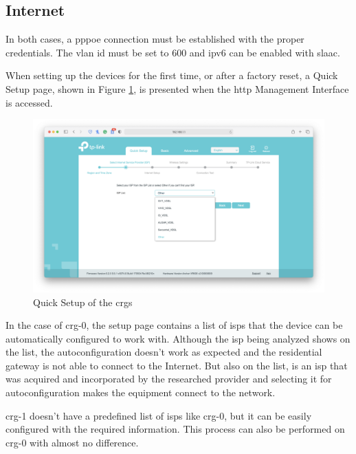 \subsection{Internet}

In both cases, a \gls{pppoe} connection must be established with the proper credentials. The \gls{vlan} \gls{id} must be set to 600 and \gls{ip}v6 can be enabled with \gls{slaac}.

When setting up the devices for the first time, or after a factory reset, a Quick Setup page, shown in Figure \ref{figure:crgs_quicksetup}, is presented when the \gls{http} Management Interface is accessed.

\begin{figure}[h]
    \centering
    \includegraphics[width=\linewidth]{contents/substituting-the-isp-cpe/internet/quick-setup.png}
    \caption{Quick Setup of the \gls{crg}s}
    \label{figure:crgs_quicksetup}
\end{figure}

In the case of \gls{crg}-0, the setup page contains a list of \glspl{isp} that the device can be automatically configured to work with. Although the \gls{isp} being analyzed shows on the list, the autoconfiguration doesn’t work as expected and the residential gateway is not able to connect to the Internet. But also on the list, is an \gls{isp} that was acquired and incorporated by the researched provider and selecting it for autoconfiguration makes the equipment connect to the network.

\gls{crg}-1 doesn’t have a predefined list of \glspl{isp} like \gls{crg}-0, but it can be easily configured with the required information. This process can also be performed on \gls{crg}-0 with almost no difference.

